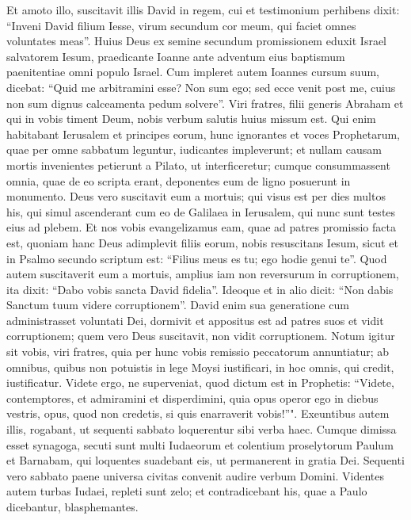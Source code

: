 \begin{biblechapter}
\verse Et amoto illo, suscitavit illis David in regem, cui et testimonium perhibens dixit: “Inveni David filium Iesse, virum secundum cor meum, qui faciet omnes voluntates meas”. 
\verse Huius Deus ex semine secundum promissionem eduxit Israel salvatorem Iesum,  
\verse praedicante Ioanne ante adventum eius baptismum paenitentiae omni populo Israel. 
\verse Cum impleret autem Ioannes cursum suum, dicebat: “Quid me arbitramini esse? Non sum ego; sed ecce venit post me, cuius non sum dignus calceamenta pedum solvere”. 
\verse Viri fratres, filii generis Abraham et qui in vobis timent Deum, nobis verbum salutis huius missum est. 
\verse Qui enim habitabant Ierusalem et principes eorum, hunc ignorantes et voces Prophetarum, quae per omne sabbatum leguntur, iudicantes impleverunt; 
\verse et nullam causam mortis invenientes petierunt a Pilato, ut interficeretur; 
\verse cumque consummassent omnia, quae de eo scripta erant, deponentes eum de ligno posuerunt in monumento. 
\verse Deus vero suscitavit eum a mortuis; 
\verse qui visus est per dies multos his, qui simul ascenderant cum eo de Galilaea in Ierusalem, qui nunc sunt testes eius ad plebem. 
\verse Et nos vobis evangelizamus eam, quae ad patres promissio facta est, 
\verse quoniam hanc Deus adimplevit filiis eorum, nobis resuscitans Iesum, sicut et in Psalmo secundo scriptum est: “Filius meus es tu; ego hodie genui te”. 
\verse Quod autem suscitaverit eum a mortuis, amplius iam non reversurum in corruptionem, ita dixit: “Dabo vobis sancta David fidelia”. 
\verse Ideoque et in alio dicit: “Non dabis Sanctum tuum videre corruptionem”. 
\verse David enim sua generatione cum administrasset voluntati Dei, dormivit et appositus est ad patres suos et vidit corruptionem; 
\verse quem vero Deus suscitavit, non vidit corruptionem. 
\verse Notum igitur sit vobis, viri fratres, quia per hunc vobis remissio peccatorum annuntiatur; ab omnibus, quibus non potuistis in lege Moysi iustificari, 
\verse in hoc omnis, qui credit, iustificatur. 
\verse Videte ergo, ne superveniat, quod dictum est in Prophetis: 
\verse “Videte, contemptores, et admiramini et disperdimini, quia opus operor ego in diebus vestris, opus, quod non credetis, si quis enarraverit vobis!”". 
\verse Exeuntibus autem illis, rogabant, ut sequenti sabbato loquerentur sibi verba haec. 
\verse Cumque dimissa esset synagoga, secuti sunt multi Iudaeorum et colentium proselytorum Paulum et Barnabam, qui loquentes suadebant eis, ut permanerent in gratia Dei. 
\verse Sequenti vero sabbato paene universa civitas convenit audire verbum Domini. 
\verse Videntes autem turbas Iudaei, repleti sunt zelo; et contradicebant his, quae a Paulo dicebantur, blasphemantes. 

\end{biblechapter}
